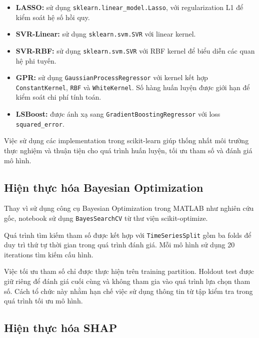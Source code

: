 \begin{itemize}
    \item \textbf{LASSO:} sử dụng
    \texttt{sklearn.linear\_model.Lasso}, với regularization L1
    để kiểm soát hệ số hồi quy.

    \item \textbf{SVR-Linear:} sử dụng
    \texttt{sklearn.svm.SVR} với linear kernel.

    \item \textbf{SVR-RBF:} sử dụng
    \texttt{sklearn.svm.SVR} với RBF kernel để biểu diễn
    các quan hệ phi tuyến.

    \item \textbf{GPR:} sử dụng
    \texttt{GaussianProcessRegressor} với kernel kết hợp
    \texttt{ConstantKernel}, \texttt{RBF} và
    \texttt{WhiteKernel}. Số hàng huấn luyện được giới hạn
    để kiểm soát chi phí tính toán.

    \item \textbf{LSBoost:} được ánh xạ sang
    \texttt{GradientBoostingRegressor} với loss
    \texttt{squared\_error}.
\end{itemize}

Việc sử dụng các implementation trong scikit-learn giúp thống
nhất môi trường thực nghiệm và thuận tiện cho quá trình huấn
luyện, tối ưu tham số và đánh giá mô hình.

\subsection{Hiện thực hóa Bayesian Optimization}
\label{subsec:implemented-bayesian-optimization}

Thay vì sử dụng công cụ Bayesian Optimization trong MATLAB
như nghiên cứu gốc, notebook sử dụng
\texttt{BayesSearchCV} từ thư viện scikit-optimize.

Quá trình tìm kiếm tham số được kết hợp với
\texttt{TimeSeriesSplit} gồm ba folds để duy trì thứ tự thời
gian trong quá trình đánh giá. Mỗi mô hình sử dụng 20 iterations
tìm kiếm cấu hình.

Việc tối ưu tham số chỉ được thực hiện trên training partition.
Holdout test được giữ riêng để đánh giá cuối cùng và không
tham gia vào quá trình lựa chọn tham số. Cách tổ chức này
nhằm hạn chế việc sử dụng thông tin từ tập kiểm tra trong
quá trình tối ưu mô hình.

\subsection{Hiện thực hóa SHAP}
\label{subsec:implemented-shap}

